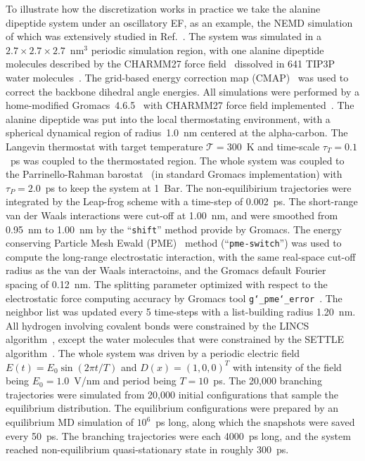 \documentclass[aps, pre, preprint,unsortedaddress,a4paper,onecolumn]{revtex4}
\newcommand{\redc}[1]{{\color{red} #1}}
\begin{document}
To illustrate how the discretization works in practice we take the alanine dipeptide system under an oscillatory EF,
as an example, the NEMD simulation of which was
extensively studied in Ref.~\cite{wang2014exploring}.
The system was simulated in a $2.7\times 2.7\times 2.7$~$\textrm{nm}^3$ periodic simulation
region, with one alanine dipeptide molecules described by the CHARMM27 force field~\cite{foloppe2000all} dissolved in 641 TIP3P water molecules~\cite{jorgensen1983comparison}.
The grid-based energy correction map (CMAP)~\cite{mackerell2004extending} was used
to correct the backbone dihedral angle energies.
All simulations were performed by a home-modified
Gromacs~4.6.5~\cite{pronk2013gromacs} with CHARMM27 force field implemented~\cite{bjelkmar2010implementation}.
The alanine dipeptide was put into the local thermostating
environment, with a spherical dynamical region of radius~1.0~nm
centered at the alpha-carbon.
The Langevin thermostat with target temperature $\mathcal T = 300$~K
and time-scale $\tau_T = 0.1$~ps was
coupled to the thermostated region.
The whole system was coupled to the Parrinello-Rahman barostat~\cite{parrinello1981polymorphic} (in standard Gromacs implementation) with $\tau_P = 2.0$~ps to
keep the system at 1~Bar. The non-equilibirium trajectories
were integrated by the Leap-frog scheme with a time-step of 0.002~ps.
The short-range van der Waals interactions were cut-off at 1.00~nm, and were smoothed from
0.95~nm to 1.00~nm by the ``\texttt{shift}'' method provide by Gromacs.
The energy conserving 
Particle Mesh Ewald (PME)~\cite{darden1993pme, essmann1995spm} method (``\texttt{pme-switch}'') was
used to compute the long-range electrostatic interaction,
with the same real-space cut-off radius as the van der Waals interactoins,
and the Gromacs default Fourier spacing of 0.12~nm.
The splitting
parameter optimized with respect to the electrostatic force computing
accuracy by Gromacs tool \texttt{g\char`_pme\char`_error}~\cite{wang2010optimizing}.
The neighbor list was updated every 5 time-steps with a list-building radius 1.20~nm.
All hydrogen involving covalent bonds were constrained by the LINCS algorithm~\cite{hess1997lincs}, except the water molecules that were constrained by the SETTLE algorithm~\cite{miyamoto2004settle}.
The whole system was driven by a periodic electric field
$E(t) = E_0\sin(2\pi t/T)$ and $D(x) = (1,0,0)^T$
with intensity of the field being $E_0 = 1.0$~V/nm and period being
$T = 10$~ps.
The 20,000 branching trajectories were simulated from 20,000
initial configurations that sample the equilibrium distribution.
The equilibrium configurations were prepared by an equilibrium MD simulation
of $10^6$~ps long, along which the snapshots were saved every 50~ps.
The branching
trajectories were each 4000~ps long, and the system reached
non-equilibrium quasi-stationary state in roughly 300~ps.
\end{document}
